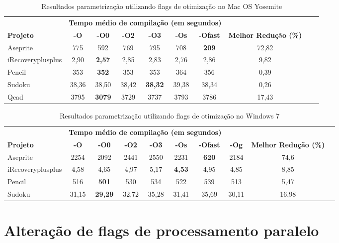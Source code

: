 \begin{table}[!ht]
\tiny
\centering
\caption{Resultados parametrização utilizando flags de otimização no Mac OS Yosemite}
\label{tab:flags_otimizacao:mac_os}
\begin{tabular}{lccccccccc}
& \multicolumn{6}{c}{\textbf{Tempo médio de compilação (em segundos)} } \\
 \textbf{Projeto}& \textbf{-O}  & \textbf{-O0}   & \textbf{-O2} & \textbf{-O3} & \textbf{-Os} & \textbf{-Ofast} & \textbf{Melhor Redução (\%)}\\ \toprule
Aseprite & 775 &  592 &  769 & 795 & 708 & \textbf{209}  & 72,82 \\ 
iRecoveryplusplus & 2,90 & \textbf{2,57} & 2,85 & 2,83 &  2,76  & 2,86  & 9,82 \\ 
Pencil & 353 & \textbf{352} & 353  & 353  & 364 & 356 &  0,39 \\ 
Sudoku & 38,36 & 38,50 & 38,42 & \textbf{38,32} & 39,38 & 38,34 & 0,26  \\ 
Qcad   & 3795 & \textbf{3079} & 3729  & 3737 & 3793  & 3786 &  17,43  \\ 
\end{tabular}
\end{table}

\begin{table}[!ht]
\tiny
\centering
\caption{Resultados parametrização utilizando flags de otimização no Windows 7}
\label{tab:flags_otimizacao:windows}
\begin{tabular}{lccccccccc}
& \multicolumn{6}{c}{\textbf{Tempo médio de compilação (em segundos)} } \\
 \textbf{Projeto}& \textbf{-O}  & \textbf{-O0}   & \textbf{-O2} & \textbf{-O3} & \textbf{-Os} & \textbf{-Ofast} & \textbf{-Og} & \textbf{Melhor Redução (\%)}\\ \toprule
Aseprite &  2254 & 2092 & 2441 & 2550 & 2231 & \textbf{620} & 2184 & 74,6  \\ 
iRecoveryplusplus & 4,58 & 4,65 & 4,97 & 5,17 & \textbf{4,53} & 4,95 &  4,85 &  8,85 \\ 
Pencil & 516 & \textbf{501} & 530  & 534  & 522 & 539 & 513 & 5,47 \\ 
Sudoku & 31,15 & \textbf{29,29} & 32,72 & 35,28 & 31,41 & 35,69 & 30,11 & 16,98 \\ 
\end{tabular}
\end{table}

\section{Alteração de flags de processamento paralelo}

